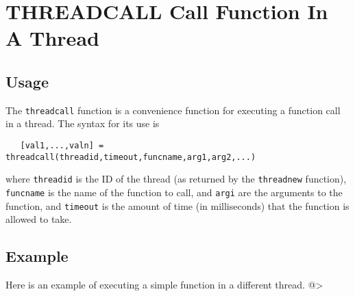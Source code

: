 \section{THREADCALL Call Function In A Thread}

\subsection{Usage}

The \verb|threadcall| function is a convenience function for executing
a function call in a thread.  The syntax for its use is
\begin{verbatim}
   [val1,...,valn] = threadcall(threadid,timeout,funcname,arg1,arg2,...)
\end{verbatim}
where \verb|threadid| is the ID of the thread (as returned by the
\verb|threadnew| function), \verb|funcname| is the name of the function to call,
and \verb|argi| are the arguments to the function, and \verb|timeout| is the
amount of time (in milliseconds) that the function is allowed to take.
\subsection{Example}

Here is an example of executing a simple function in a different thread.
@>
